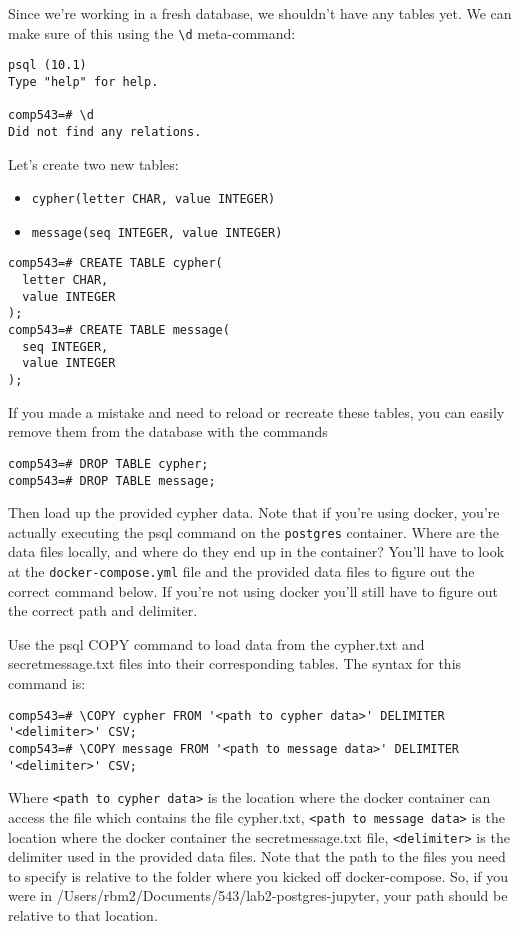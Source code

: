 \documentclass[paper=letter, fontsize=12pt]{article}
\numberwithin{equation}{section}
\numberwithin{figure}{section}
\numberwithin{table}{section}
\begin{document}
Since we're working in a fresh database, we shouldn't have any tables yet.  We
can make sure of this using the
\texttt{{\textbackslash}d} meta-command:
\begin{verbatim}
psql (10.1)
Type "help" for help.

comp543=# \d
Did not find any relations.
\end{verbatim}

Let's create two new tables:
\begin{itemize}
  \item \texttt{cypher(letter CHAR, value INTEGER)}
  \item \texttt{message(seq INTEGER, value INTEGER)}
\end{itemize}

\begin{verbatim}
comp543=# CREATE TABLE cypher(
  letter CHAR,
  value INTEGER
);
comp543=# CREATE TABLE message(
  seq INTEGER,
  value INTEGER
);
\end{verbatim}

If you made a mistake and need to reload or recreate these tables, you can easily remove them from the database with the commands
\begin{verbatim}
comp543=# DROP TABLE cypher;
comp543=# DROP TABLE message;
\end{verbatim}


Then load up the provided cypher data.  Note that if you're using docker, you're
actually executing the psql command on the \texttt{postgres} container.  Where
are the data files locally, and where do they end up in the container?  You'll
have to look at the \texttt{docker-compose.yml} file and the provided data
files to figure out the correct command below.  If you're not using
docker you'll still have to figure out the correct path and delimiter.

Use the psql COPY command to load data from the cypher.txt and
secretmessage.txt files into their corresponding tables. The syntax for this
command is:

\begin{verbatim}
comp543=# \COPY cypher FROM '<path to cypher data>' DELIMITER '<delimiter>' CSV;  
comp543=# \COPY message FROM '<path to message data>' DELIMITER '<delimiter>' CSV;  
\end{verbatim}

Where \texttt{<path to cypher data>} is the location where the docker container
can access the file which contains the file cypher.txt, \texttt{<path to
  message data>} is the location where the docker container the
secretmessage.txt  file, \texttt{<delimiter>} is the delimiter used in the
provided data files. Note that the path to the files you need to specify is relative to the folder where you kicked off docker-compose. So, if you were in /Users/rbm2/Documents/543/lab2-postgres-jupyter, your path should be relative to that location.
\end{document}
